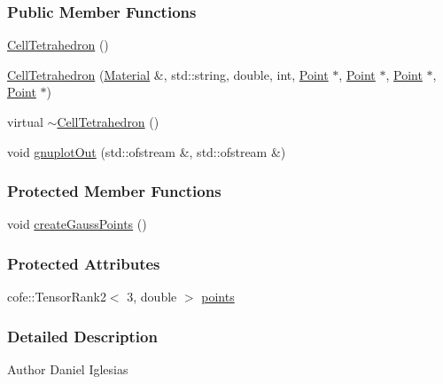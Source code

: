 \subsubsection*{Public Member Functions}
\begin{DoxyCompactItemize}
\item 
\hyperlink{classmknix_1_1_cell_tetrahedron_a6824b4f7304f0717ccdbaf32126239a0}{Cell\+Tetrahedron} ()
\item 
\hyperlink{classmknix_1_1_cell_tetrahedron_ac4c2343cfe88b0f0a0c2be8636fd0cde}{Cell\+Tetrahedron} (\hyperlink{classmknix_1_1_material}{Material} \&, std\+::string, double, int, \hyperlink{classmknix_1_1_point}{Point} $\ast$, \hyperlink{classmknix_1_1_point}{Point} $\ast$, \hyperlink{classmknix_1_1_point}{Point} $\ast$, \hyperlink{classmknix_1_1_point}{Point} $\ast$)
\item 
virtual \hyperlink{classmknix_1_1_cell_tetrahedron_a4ae5db633022a1714da463f4c32ffa03}{$\sim$\+Cell\+Tetrahedron} ()
\item 
void \hyperlink{classmknix_1_1_cell_tetrahedron_aba4f93f294a8ceea377cc2feb44f56db}{gnuplot\+Out} (std\+::ofstream \&, std\+::ofstream \&)
\end{DoxyCompactItemize}
\subsubsection*{Protected Member Functions}
\begin{DoxyCompactItemize}
\item 
void \hyperlink{classmknix_1_1_cell_tetrahedron_a933dde9cb028e9be1f0f9024fb7b898d}{create\+Gauss\+Points} ()
\end{DoxyCompactItemize}
\subsubsection*{Protected Attributes}
\begin{DoxyCompactItemize}
\item 
cofe\+::\+Tensor\+Rank2$<$ 3, double $>$ \hyperlink{classmknix_1_1_cell_tetrahedron_ad43ea7159ab2b6818636340c6f76de65}{points}
\end{DoxyCompactItemize}


\subsubsection{Detailed Description}
\begin{DoxyAuthor}{Author}
Daniel Iglesias 
\end{DoxyAuthor}



